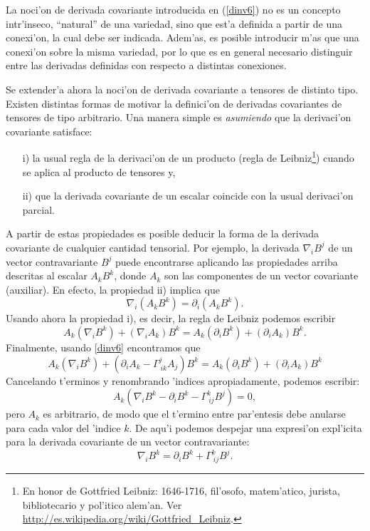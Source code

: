  La noci'on de derivada covariante introducida en (\ref{dinv6}) no es un concepto intr'inseco, ``natural'' de una variedad, sino que est'a definida a partir de una conexi'on, la cual debe ser indicada. Adem'as, es posible introducir m'as que una conexi'on sobre la misma variedad, por lo que es en general necesario distinguir entre las derivadas definidas con respecto a distintas conexiones.

Se extender'a ahora la noci'on de derivada covariante a tensores de distinto tipo. Existen distintas formas de motivar la definici'on de derivadas covariantes de tensores de tipo arbitrario. Una manera simple es  \textit{asumiendo} que la derivaci'on covariante satisface:
\begin{itemize}
\item[i)] la usual regla de la derivaci'on de un producto (regla de
Leibniz\footnote{En honor de Gottfried Leibniz: 1646-1716, fil'osofo, matem'atico, jurista, bibliotecario y pol'itico alem'an. Ver \url{http://es.wikipedia.org/wiki/Gottfried_Leibniz}.}) cuando se aplica al producto de tensores y,
\item[ii)] que la derivada covariante de un escalar coincide con la usual derivaci'on parcial.
\end{itemize}

A partir de estas propiedades es posible deducir la forma de la derivada covariante de cualquier cantidad tensorial. Por ejemplo, la derivada $\nabla_iB^j$ de un vector contravariante $B^j$ puede encontrarse aplicando las propiedades arriba descritas al escalar $A_k B^k $, donde $A_k$ son las componentes de un vector covariante (auxiliar). En efecto, la propiedad ii) implica que
\begin{equation}
\nabla_i\left( A_k B^k\right)=\partial_i\left( A_k B^k \right).\label{dinv12}
\end{equation}
Usando ahora la propiedad i), es decir, la regla de Leibniz podemos escribir
\begin{equation}
A_k (\nabla_iB^k)+(\nabla_i A_k)B^k = A_k (\partial_iB^k) +(\partial_iA_k)B^k .
\end{equation}
Finalmente, usando \eqref{dinv6} encontramos que
\begin{equation}
A_k (\nabla_iB^k) +\left(\partial_iA_k-\Gamma_{\ ik}^jA_j\right) B^k=A_k (\partial_iB^k) +(\partial_iA_k)B^k 
\end{equation}
Cancelando t'erminos y renombrando 'indices apropiadamente, podemos
escribir:
\begin{equation}
A_k \left( \nabla_iB^k -\partial_iB^k -\Gamma_{\ ij}^k B^j\right) =0,
\end{equation}
pero $A_k $ es arbitrario, de modo que el t'ermino entre par'entesis debe anularse para cada valor del 'indice $k$. De aqu'i podemos despejar una expresi'on expl'icita para la derivada covariante de un vector contravariante:
\begin{equation}
\boxed{\nabla_iB^k =\partial_iB^k +\Gamma_{\ ij}^kB^j .} \label{dinv15}
\end{equation}

